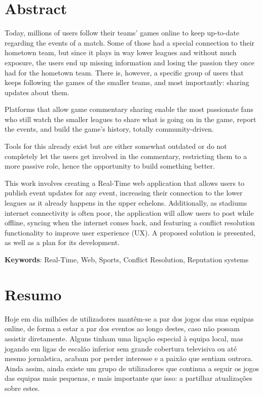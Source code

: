 \chapter*{Abstract}

Today, millions of users follow their teams' games online to keep up-to-date regarding the events of a match. Some of those had a special connection to their hometown team, but since it plays in way lower leagues and without much exposure,  the users end up missing information and losing the passion they once had for the hometown team. There is, however,  a specific group of users that keeps following the games of the smaller teams, and most importantly: sharing updates about them. 

Platforms that allow game commentary sharing enable the most passionate fans who still watch the smaller leagues to share what is going on in the game, report the events, and build the game's history, totally community-driven. 

Tools for this already exist but are either somewhat outdated or do not completely let the users get involved in the commentary, restricting them to a more passive role, hence the opportunity to build something better. 

This work involves creating a Real-Time web application that allows users to publish event updates for any event, increasing their connection to the lower leagues as it already happens in the upper echelons. Additionally, as stadiums internet connectivity is often poor, the application will allow users to post while offline, syncing when the internet comes back, and featuring a conflict resolution functionality to improve user experience (UX). A proposed solution is presented, as well as a plan for its development.


\vspace*{10mm}\noindent
\textbf{Keywords}: Real-Time, Web, Sports, Conflict Resolution, Reputation systems

\chapter*{Resumo}

Hoje em dia milhões de utilizadores mantêm-se a par dos jogos das suas equipas online, de forma a estar a par dos eventos ao longo destes, caso não possam assistir diretamente. Alguns tinham uma ligação especial à equipa local, mas jogando em ligas de escalão inferior sem grande cobertura televisiva ou até mesmo jornalstica, acabam por perder interesse e a paixão que sentiam outrora. Ainda assim, ainda existe um grupo de utilizadores que continua a seguir os jogos das equipas mais pequenas, e mais importante que isso: a partilhar atualizações sobre estes. 

